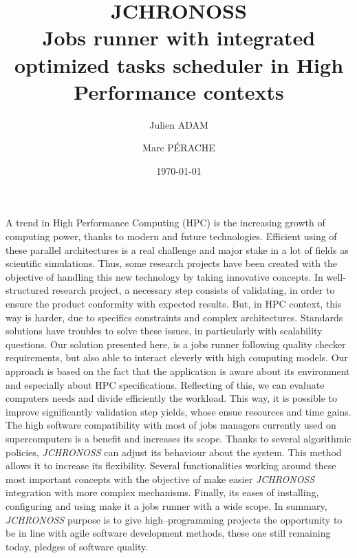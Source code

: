 \documentclass[10pt]{article}
\title{\textbf{JCHRONOSS} \\ Jobs runner with integrated optimized tasks scheduler in High Performance contexts}
\author{Julien ADAM \and Marc PÉRACHE}
\date{\today}
\begin{document}
\maketitle
\thispagestyle{empty} %
A trend in High Performance Computing (HPC) is the increasing growth of computing power, thanks to modern and future technologies. Efficient using of these parallel architectures is a real challenge and major stake in a lot of fields as scientific simulations. Thus, some research projects have been created with the objective of handling this new technology by taking innovative concepts. In well-structured research project, a necessary step consists of validating, in order to ensure the product conformity with expected results. But, in HPC context, this way is harder, due to specifics constraints and complex architectures. Standards solutions have troubles to solve these issues, in particularly with scalability questions. Our solution presented here, is a jobs runner following quality checker requirements, but also able to interact cleverly with high computing models. Our approach is based on the fact that the application is aware about its environment and especially about HPC specifications. Reflecting of this, we can evaluate computers needs and divide efficiently the workload. This way, it is possible to improve significantly validation step yields, whose ensue resources and time gains. The high software compatibility with most of jobs managers currently used on supercomputers is a benefit and increases its scope. Thanks to several algorithmic policies, \textit{JCHRONOSS} can adjust its behaviour about the system. This method allows it to increase its flexibility. Several functionalities working around these most important concepts with the objective of make easier \textit{JCHRONOSS} integration with more complex mechanisms. Finally, its eases of installing, configuring and using make it a jobs runner with a wide scope. In summary, \textit{JCHRONOSS} purpose is to give high--programming projects the opportunity to be in line with agile software development methods, these one still remaining today, pledges of software quality. 
\end{document}
